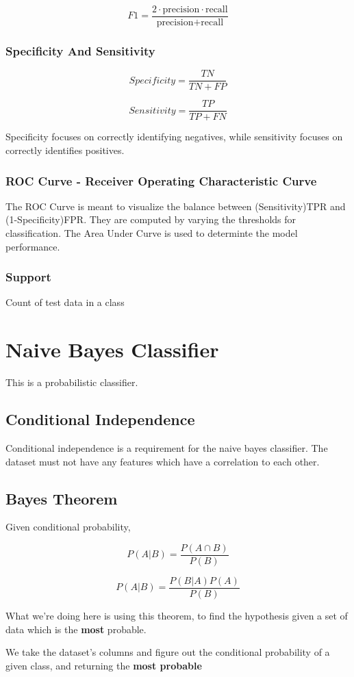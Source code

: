 \documentclass[11pt]{article}
\begin{document}
\[
F1 = \frac{2 \cdot \text{precision} \cdot \text{recall}}{\text{precision} + \text{recall}}
\]
\subsubsection{Specificity And Sensitivity}
\label{sec:org7581c84}
$$
Specificity = \frac{TN}{TN+FP}
$$

$$
Sensitivity = \frac{TP}{TP+ FN}
$$

Specificity focuses on correctly identifying negatives, while sensitivity focuses on correctly identifies positives.
\subsubsection{ROC Curve - Receiver Operating Characteristic Curve}
\label{sec:org8afed22}
The ROC Curve is meant to visualize the balance between (Sensitivity)TPR and (1-Specificity)FPR. They are computed by varying the thresholds for classification. The Area Under Curve is used to determinte the model performance.
\subsubsection{Support}
\label{sec:orge2df73f}
Count of test data in a class
\section{Naive Bayes Classifier}
\label{sec:orge81c04d}
This is a probabilistic classifier.
\subsection{Conditional Independence}
\label{sec:org0b3e896}
Conditional independence is a requirement for the naive bayes classifier. The dataset must not have any features which have a correlation to each other.
\subsection{Bayes Theorem}
\label{sec:org3b26f76}
Given conditional probability,

$$P(A|B) = \frac{P(A \cap B)}{P(B)}$$

$$P(A|B) = \frac{P(B|A) P (A)}{P(B)}$$

What we're doing here is using this theorem, to find the hypothesis given a set of data which is the \textbf{most} probable.

We take the dataset's columns and figure out the conditional probability of a given class, and returning the \textbf{most probable}
\end{document}
